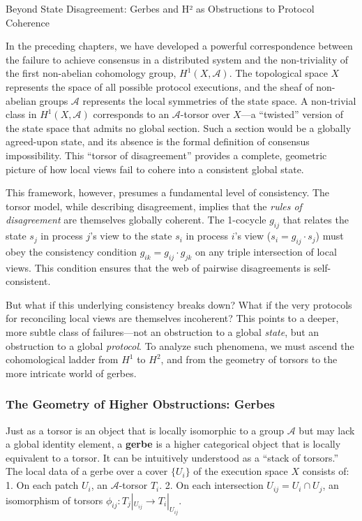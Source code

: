 \documentclass[
]{article}
\begin{document}
\protect{}\label{chapter-4-4-Beyond_State_Disagreement__Gerbes_and_Huxb2}{}

Beyond State Disagreement: Gerbes and H² as Obstructions to Protocol
Coherence

In the preceding chapters, we have developed a powerful correspondence
between the failure to achieve consensus in a distributed system and the
non-triviality of the first non-abelian cohomology group,
\(H^1(X, \mathcal{A})\). The topological space \(X\) represents the
space of all possible protocol executions, and the sheaf of non-abelian
groups \(\mathcal{A}\) represents the local symmetries of the state
space. A non-trivial class in \(H^1(X, \mathcal{A})\) corresponds to an
\(\mathcal{A}\)-torsor over \(X\)---a ``twisted'' version of the state
space that admits no global section. Such a section would be a globally
agreed-upon state, and its absence is the formal definition of consensus
impossibility. This ``torsor of disagreement'' provides a complete,
geometric picture of how local views fail to cohere into a consistent
global state.

This framework, however, presumes a fundamental level of consistency.
The torsor model, while describing disagreement, implies that the
\emph{rules of disagreement} are themselves globally coherent. The
1-cocycle \(g_{ij}\) that relates the state \(s_j\) in process \(j\)'s
view to the state \(s_i\) in process \(i\)'s view
(\(s_i = g_{ij} \cdot s_j\)) must obey the consistency condition
\(g_{ik} = g_{ij} \cdot g_{jk}\) on any triple intersection of local
views. This condition ensures that the web of pairwise disagreements is
self-consistent.

But what if this underlying consistency breaks down? What if the very
protocols for reconciling local views are themselves incoherent? This
points to a deeper, more subtle class of failures---not an obstruction
to a global \emph{state}, but an obstruction to a global
\emph{protocol}. To analyze such phenomena, we must ascend the
cohomological ladder from \(H^1\) to \(H^2\), and from the geometry of
torsors to the more intricate world of gerbes.

\subsubsection{The Geometry of Higher Obstructions:
Gerbes}\label{the-geometry-of-higher-obstructions-gerbes}

Just as a torsor is an object that is locally isomorphic to a group
\(\mathcal{A}\) but may lack a global identity element, a \textbf{gerbe}
is a higher categorical object that is locally equivalent to a torsor.
It can be intuitively understood as a ``stack of torsors.'' The local
data of a gerbe over a cover \(\{U_i\}\) of the execution space \(X\)
consists of: 1. On each patch \(U_i\), an \(\mathcal{A}\)-torsor
\(T_i\). 2. On each intersection \(U_{ij} = U_i \cap U_j\), an
isomorphism of torsors \(\phi_{ij}: T_j|_{U_{ij}} \to T_i|_{U_{ij}}\).
\end{document}
